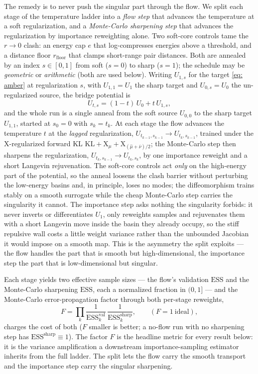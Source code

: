 \documentclass[11pt]{article}
\providecommand{\KL}{\mathrm{KL}}
\providecommand{\X}{\mathrm{X}}
\providecommand{\ESS}{\mathrm{ESS}}
\begin{document}
The remedy is to never push the singular part through the flow. We split each stage of the temperature ladder
into a \emph{flow step} that advances the temperature at a soft regularization, and a \emph{Monte-Carlo
sharpening step} that advances the regularization by importance reweighting alone. Two soft-core controls tame
the $r \to 0$ clash: an energy cap $e$ that log-compresses energies above a threshold, and a distance floor
$r_{\mathrm{floor}}$ that clamps short-range pair distances. Both are annealed by an index $s \in [0,1]$ from
soft ($s = 0$) to sharp ($s = 1$); the schedule may be \emph{geometric} or \emph{arithmetic} (both are used
below). Writing $U_{1,s}$ for the target \eqref{eq: amber} at regularization $s$, with $U_{1,1} = U_1$ the
sharp target and $U_{0,s} = U_0$ the un-regularized source, the bridge potential is
\begin{equation}
    U_{t,s} = (1-t)\,U_0 + t\,U_{1,s},
    \label{eq: bridge}
\end{equation}
and the whole run is a single anneal from the soft source $U_{0,0}$ to the sharp target $U_{1,1}$, started at
$s_0 = 0$ with $s_k = t_k$. At each stage the flow advances the temperature $t$ at the \emph{lagged}
regularization, $U_{t_{k-1},s_{k-1}} \to U_{t_k,s_{k-1}}$, trained under the $\X$-regularized forward KL
$\KL{+}\X_\mu{+}\X_{(\hat\mu+\bar\nu)/2}$; the Monte-Carlo step then sharpens the regularization,
$U_{t_k,s_{k-1}} \to U_{t_k,s_k}$, by one importance reweight and a short Langevin rejuvenation. The soft-core
controls act \emph{only} on the high-energy part of the potential, so the anneal loosens the clash barrier
without perturbing the low-energy basins and, in principle, loses no modes; the diffeomorphism trains stably on
a smooth surrogate while the cheap Monte-Carlo step carries the singularity it cannot. The importance step asks
nothing the singularity forbids: it never inverts or differentiates $U_1$, only reweights samples and
rejuvenates them with a short Langevin move inside the basin they already occupy, so the stiff repulsive wall
costs a little weight variance rather than the unbounded Jacobian it would impose on a smooth map. This is the
asymmetry the split exploits --- the flow handles the part that is smooth but high-dimensional, the importance
step the part that is low-dimensional but singular.

Each stage yields two effective sample sizes --- the flow's validation $\ESS$ and the Monte-Carlo sharpening
$\ESS$, each a normalized fraction in $(0,1]$ --- and the Monte-Carlo error-propagation factor through both
per-stage reweights,
\begin{equation}
    F = \prod_{k} \frac{1}{\ESS^{\mathrm{val}}_k}\,\frac{1}{\ESS^{\mathrm{sharp}}_k}, \qquad (F = 1\ \text{ideal}),
    \label{eq: F}
\end{equation}
charges the cost of both ($F$ smaller is better; a no-flow run with no sharpening step has
$\ESS^{\mathrm{sharp}} \equiv 1$). The factor $F$ is the headline metric for every result below: it is the
variance amplification a downstream importance-sampling estimator inherits from the full ladder. The split lets
the flow carry the smooth transport and the importance step carry the singular sharpening.
\end{document}
